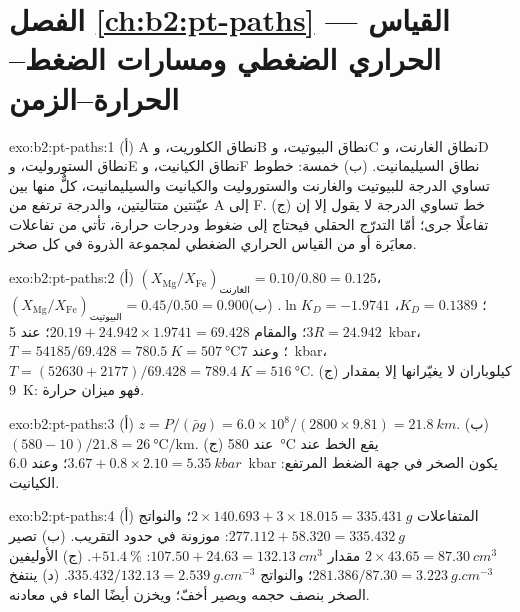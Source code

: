 \section*{الفصل \ref{ch:b2:pt-paths} --- القياس الحراري الضغطي ومسارات الضغط--الحرارة--الزمن}

\begin{solution}{exo:b2:pt-paths:1}
(أ) A نطاق الكلوريت، وB نطاق البيوتيت، وC نطاق الغارنت، وD نطاق الستوروليت، وE نطاق الكيانيت،
وF نطاق السيليمانيت. (ب) خمسة: خطوط تساوي الدرجة للبيوتيت والغارنت والستوروليت والكيانيت والسيليمانيت،
كلٌّ منها بين عيّنتين متتاليتين، والدرجة ترتفع من A إلى F. (ج) خط تساوي الدرجة
لا يقول إلا إن تفاعلًا جرى؛ أمّا التدرّج الحقلي فيحتاج إلى ضغوط ودرجات حرارة،
تأتي من تفاعلات معايَرة أو من القياس الحراري الضغطي لمجموعة الذروة في كل
صخر.
\end{solution}

\begin{solution}{exo:b2:pt-paths:2}
(أ) $(X_{\text{Mg}}/X_{\text{Fe}})_{\text{الغارنت}} = 0.10/0.80 = 0.125$،
$(X_{\text{Mg}}/X_{\text{Fe}})_{\text{البيوتيت}} = 0.45/0.50 = 0.900$؛ $K_D = 0.1389$، $\ln K_D =
-1.9741$. (ب) $3R = 24.942$؛ والمقام $20.19 + 24.942\times1.9741 = 69.428$؛ عند
\qty{5}{kbar}، $T = 54185/69.428 = \qty{780.5}{K} = \qty{507}{\celsius}$؛ وعند
\qty{7}{kbar}، $T = (52630 + 2177)/69.428 = \qty{789.4}{K} = \qty{516}{\celsius}$.
(ج) كيلوباران لا يغيّرانها إلا بمقدار \qty{9}{K}: فهو ميزان حرارة.
\end{solution}

\begin{solution}{exo:b2:pt-paths:3}
(أ) $z = P/(\bar\rho g) = 6.0\times10^8/(2800\times9.81) = \qty{21.8}{km}$.
(ب) $(580 - 10)/21.8 = \qty{26}{\celsius\per\km}$. (ج) عند \qty{580}{\celsius} يقع الخط
عند $3.67 + 0.8\times2.10 = \qty{5.35}{kbar}$؛ وعند \qty{6.0}{kbar} يكون الصخر في
جهة الضغط المرتفع: الكيانيت.
\end{solution}

\begin{solution}{exo:b2:pt-paths:4}
(أ) المتفاعلات $2\times140.693 + 3\times18.015 = \qty{335.431}{g}$؛ والنواتج $277.112 +
58.320 = \qty{335.432}{g}$: موزونة في حدود التقريب. (ب) تصير $2\times43.65 =
\qty{87.30}{cm^3}$ مقدار $107.50 + 24.63 = \qty{132.13}{cm^3}$: $+\qty{51.4}{\percent}$.
(ج) الأوليفين $281.386/87.30 = \qty{3.223}{g.cm^{-3}}$؛ والنواتج $335.432/132.13 =
\qty{2.539}{g.cm^{-3}}$. (د) ينتفخ الصخر بنصف حجمه ويصير أخفّ؛
ويخزن أيضًا الماء في معادنه.
\end{solution}

